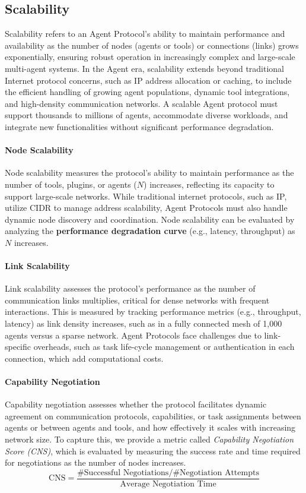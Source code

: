 \documentclass[10pt,preprint]{article}
\begin{document}
\subsection{Scalability}
Scalability refers to an Agent Protocol’s ability to maintain performance and availability as the number of nodes (agents or tools) or connections (links) grows exponentially, ensuring robust operation in increasingly complex and large-scale multi-agent systems. In the Agent era, scalability extends beyond traditional Internet protocol concerns, such as IP address allocation or caching, to include the efficient handling of growing agent populations, dynamic tool integrations, and high-density communication networks. A scalable Agent protocol must support thousands to millions of agents, accommodate diverse workloads, and integrate new functionalities without significant performance degradation.

\paragraph{Node Scalability} Node scalability measures the protocol’s ability to maintain performance as the number of tools, plugins, or agents ($N$) increases, reflecting its capacity to support large-scale networks. While traditional internet protocols, such as IP, utilize CIDR \citep{fuller1993classless} to manage address scalability, Agent Protocols must also handle dynamic node discovery and coordination. Node scalability can be evaluated by analyzing the \textbf{performance degradation curve} (e.g., latency, throughput) as $N$ increases. 

\paragraph{Link Scalability} Link scalability assesses the protocol’s performance as the number of communication links multiplies, critical for dense networks with frequent interactions. This is measured by tracking performance metrics (e.g., throughput, latency) as link density increases, such as in a fully connected mesh of 1,000 agents versus a sparse network. Agent Protocols face challenges due to link-specific overheads, such as task life-cycle management or authentication in each connection, which add computational costs.

\paragraph{Capability Negotiation} Capability negotiation assesses whether the protocol facilitates dynamic agreement on communication protocols, capabilities, or task assignments between agents or between agents and tools, and how effectively it scales with increasing network size. To capture this, we provide a metric called \textit{Capability Negotiation Score (CNS)}, which is evaluated by measuring the success rate and time required for negotiations as the number of nodes increases.
\begin{equation}
\text{CNS} = \frac{\# \text{Successful Negotiations} / \# \text{Negotiation Attempts}}{\text{Average Negotiation Time}}
\end{equation}
\end{document}
